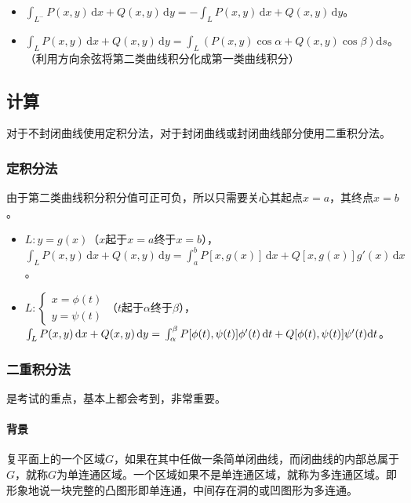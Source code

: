 \documentclass[UTF8, 12pt]{ctexart}
\begin{document}
\begin{itemize}
    \item $\int_{L^-}P(x,y)\,\textrm{d}x+Q(x,y)\,\textrm{d}y=-\int_LP(x,y)\,\textrm{d}x+Q(x,y)\,\textrm{d}y$。
    \item $\int_LP(x,y)\,\textrm{d}x+Q(x,y)\,\textrm{d}y=\int_L(P(x,y)\cos\alpha+Q(x,y)\cos\beta)\textrm{d}s$。（利用方向余弦将第二类曲线积分化成第一类曲线积分）
\end{itemize}

\subsection{计算}

对于不封闭曲线使用定积分法，对于封闭曲线或封闭曲线部分使用二重积分法。

\subsubsection{定积分法}

由于第二类曲线积分积分值可正可负，所以只需要关心其起点$x=a$，其终点$x=b$。

\begin{itemize}
    \item $L:y=g(x)$（$x$起于$x=a$终于$x=b$），$\int_LP(x,y)\,\textrm{d}x+Q(x,y)\,\textrm{d}y=\int_a^bP[x,g(x)]\,\textrm{d}x+Q[x,g(x)]g'(x)\,\textrm{d}x$。
    \item $L:\left\{\begin{array}{c}
        x=\phi(t) \\
        y=\psi(t)
    \end{array}\right.$（$t$起于$\alpha$终于$\beta$），$\int_LP(x,y)\,\textrm{d}x+Q(x,y)\,\textrm{d}y=\\\int_\alpha^\beta P[\phi(t),\psi(t)]\phi'(t)\,\textrm{d}t+Q[\phi(t),\psi(t)]\psi'(t)\textrm{d}t$。
\end{itemize}

\subsubsection{二重积分法}

是考试的重点，基本上都会考到，非常重要。

\paragraph{背景} \leavevmode \medskip

复平面上的一个区域$G$，如果在其中任做一条简单闭曲线，而闭曲线的内部总属于$G$，就称$G$为单连通区域。一个区域如果不是单连通区域，就称为多连通区域。即形象地说一块完整的凸图形即单连通，中间存在洞的或凹图形为多连通。
\end{document}
